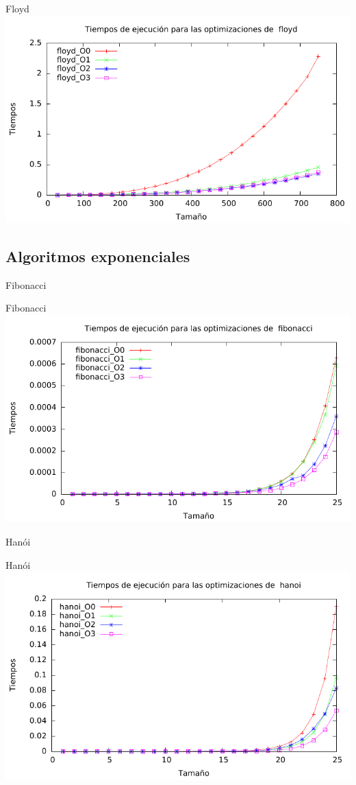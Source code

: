 \documentclass[10pt,compress,usetitleprogressbar,mathserif]{beamer}
\begin{document}
\begin{frame}{Floyd}
	\includegraphics[width = \textwidth ]{img/floyd_optim_g.pdf}
\end{frame}

\subsection{Algoritmos exponenciales}

\begin{frame}{Fibonacci}
	
\end{frame}

\begin{frame}{Fibonacci}
	\includegraphics[width = \textwidth ]{img/fibonacci_optim_g.pdf}
\end{frame}

\begin{frame}{Hanói}
	
\end{frame}

\begin{frame}{Hanói}
	\includegraphics[width = \textwidth ]{img/hanoi_optim_g.pdf}
\end{frame}
\end{document}
